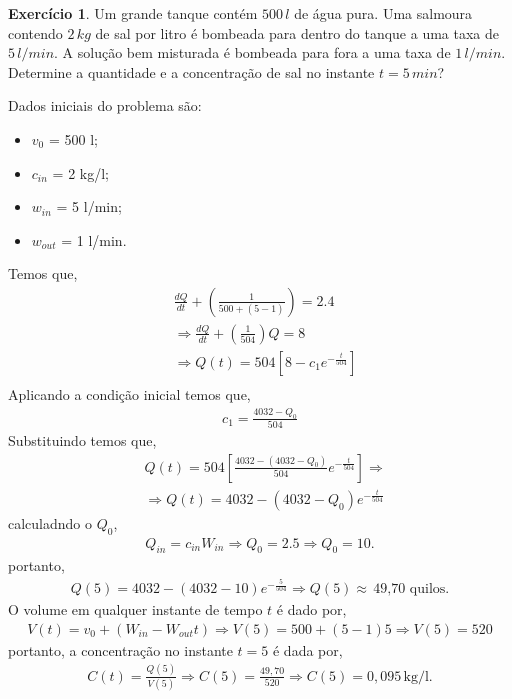 \documentclass[a4paper,12pt,reqno,natbib]{amsart}
\theoremstyle{definition}
\newtheorem{exercise}{Exerc\'icio}
\begin{document}
\begin{exercise}
Um grande tanque contém $500\,l$ de água pura. Uma salmoura contendo $2\,kg$ de sal por litro é bombeada para dentro do tanque a uma taxa de $5\,l/min$. A solução bem misturada 
é bombeada para fora a uma taxa de $1\,l/min$. Determine a quantidade e a concentração de sal no instante $t = 5\,min$?
\end{exercise}
Dados iniciais do problema s\~ao:
\begin{itemize}
	\item $v_0    $ = 500 l;
	\item $c_{in} $ = 2 kg/l;
	\item $w_{in} $ = 5 l/min;
	\item $w_{out}$ = 1 l/min.
\end{itemize}
Temos que,
\begin{align*}
	&\frac{dQ}{dt} + \left (\frac{1}{ 500 + (5-1)}\right ) =  2.4 \\
	&\Rightarrow \frac{dQ}{dt}+ \left (\frac{1}{ 504}\right ) Q= 8  \\
	&\Rightarrow Q(t) = 504\left [8 - c_1e^{-\frac{t}{504}}\right ] \\
\end{align*}
Aplicando a condi\c c\~ao inicial temos que,
\begin{align*}
	c_1 = \frac{4032 - Q_0}{504}
\end{align*}
Substituindo temos que,
\begin{align*}
	&Q(t) = 504\left [\frac{4032 -(4032 - Q_0)}{504}e^{-\frac{t}{504}}\right ] \Rightarrow \\
	&\Rightarrow Q(t) = 4032 -(4032 - Q_0)e^{-\frac{t}{504}}
\end{align*}
calculadndo o $Q_0$,
\begin{align*}
	Q_{in} = c_{in}W_{in} \Rightarrow Q_0 = 2.5 \Rightarrow Q_0 = 10.
\end{align*}
portanto,
\begin{align*}
	Q(5) = 4032 - (4032 -10)e^{-\frac{5}{504}} \Rightarrow  \boxed{Q(5) \approx \hspace{2pt} \mbox{49,70 quilos.}}
\end{align*}
O volume em qualquer instante de tempo $t$ \'e dado por,
\begin{align*}
	V(t) = v_0 +\left (W_{in} - W_{out}t\right ) \Rightarrow V(5) = 500 + (5-1)5 \Rightarrow V(5) = 520
\end{align*}
portanto, a concentra\c c\~ao no instante $t = 5$ \'e dada por,
\begin{align*}
	C(t) = \frac{Q(5)}{V(5)} \Rightarrow C(5) = \frac{49,70}{520} \Rightarrow \boxed{C(5) = 0,095 \hspace{2pt}\mbox{kg/l}.}
\end{align*}
\begin{center}
\vspace{0.7 cm}
\end{center}
\end{document}
